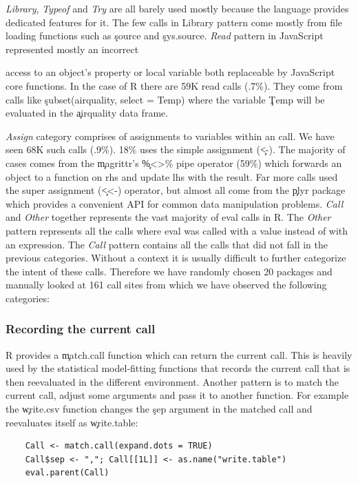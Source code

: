 \documentclass[conference]{IEEEtran}
\newcommand{\PatternReadRnd}{59K\xspace}
\newcommand{\PatternReadRatio}{.7\%\xspace}
\newcommand{\PatternAssignRnd}{68K\xspace}
\newcommand{\PatternAssignRatio}{.9\%\xspace}
\newcommand{\PatternAssignArrowRatio}{18\%\xspace}
\newcommand{\PatternAssignArrowMagrittrRatio}{59\%\xspace}
\newcommand{\PatternManualPackages}{20\xspace}
\newcommand{\PatternManualCallsites}{161\xspace}
\begin{document}
\noindent \emph{Library}, \emph{Typeof} and \emph{Try} are all barely used
mostly because the language provides dedicated features for it. The few calls in
Library pattern come mostly from file loading functions such as \c{source} and
\c{sys.source}.
%
\noindent \emph{Read} pattern in JavaScript represented mostly an incorrect

access to an object's property or local variable both replaceable by
JavaScript core functions. In the case of R there are \PatternReadRnd read
\eval calls (\PatternReadRatio). They come from calls like
\c{subset(airquality, select = Temp)} where the variable \c{Temp} will be
evaluated in the \c{airquality} data frame.

%
\noindent \emph{Assign} category comprises of assignments to variables
within an \eval call. We have seen \PatternAssignRnd such calls
(\PatternAssignRatio).  \PatternAssignArrowRatio uses the simple assignment
(\c{<-}). The majority of cases comes from the \c{magrittr}'s \c{\%<>\%}
pipe operator (\PatternAssignArrowMagrittrRatio) which forwards an object to
a function on rhs and update lhs with the result. Far more calls used the
super assignment (\c{<<-}) operator, but almost all come from the \c{plyr}
package which provides a convenient API for common data manipulation
problems.
%
\noindent \emph{Call} and \emph{Other} together represents the vast majority
of eval calls in R. The \emph{Other} pattern represents all the calls where
eval was called with a value instead of with an expression. The \emph{Call}
pattern contains all the calls that did not fall in the previous
categories. Without a context it is usually difficult to further categorize
the intent of these calls.  Therefore we have randomly chosen
\PatternManualPackages packages and manually looked at
\PatternManualCallsites call sites from which we have observed the following
categories:

\subsubsection{Recording the current call} R provides a \c{match.call} function
which can return the current call. This is heavily used by the statistical
model-fitting functions that records the current call that is then
reevaluated in the different environment. Another pattern is to match the
current call, adjust some arguments and pass it to another function. For
example the \c{write.csv} function changes the \c{sep} argument in the
matched call and reevaluates itself as \c{write.table}:
%
\begin{lstlisting}
    Call <- match.call(expand.dots = TRUE)
    Call$sep <- ","; Call[[1L]] <- as.name("write.table")
    eval.parent(Call)
\end{lstlisting}
\end{document}
